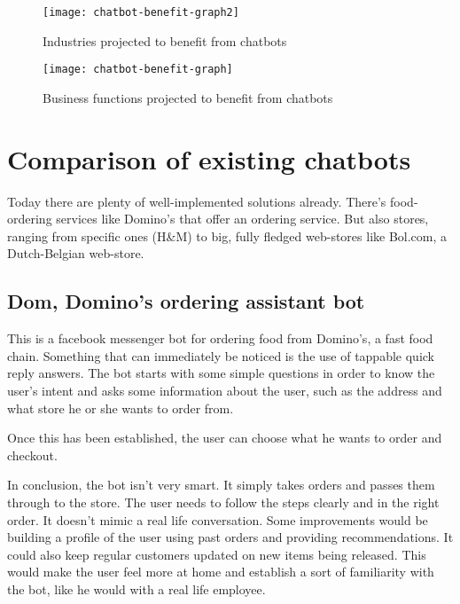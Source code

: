 \begin{figure}[p]
	\centering
	\texttt{[image: chatbot-benefit-graph2]}
	\caption{Industries projected to benefit from chatbots~\cite{chatbot-industry-benefits}}
	\label{fig:chatbot-benefit-graph2}
\end{figure}

\begin{figure}[p]
	\centering
	\texttt{[image: chatbot-benefit-graph]}
	\caption{Business functions projected to benefit from chatbots~\cite{chatbot-industry-benefits}}
	\label{fig:chatbot-benefit-graph}
\end{figure}

\newpage

\section{Comparison of existing chatbots}

Today there are plenty of well-implemented solutions already. There's food-ordering services like Domino's that offer an ordering service. But also stores, ranging from specific ones (H\&M) to big, fully fledged web-stores like Bol.com, a Dutch-Belgian web-store.

\subsection{Dom, Domino's ordering assistant bot}

This is a facebook messenger bot for ordering food from Domino's, a fast food chain. Something that can immediately be noticed is the use of tappable quick reply answers. The bot starts with some simple questions in order to know the user's intent and asks some information about the user, such as the address and what store he or she wants to order from.

Once this has been established, the user can choose what he wants to order and checkout.

In conclusion, the bot isn't very smart. It simply takes orders and passes them through to the store. The user needs to follow the steps clearly and in the right order. It doesn't mimic a real life conversation. Some improvements would be building a profile of the user using past orders and providing recommendations. It could also keep regular customers updated on new items being released. This would make the user feel more at home and establish a sort of familiarity with the bot, like he would with a real life employee.

